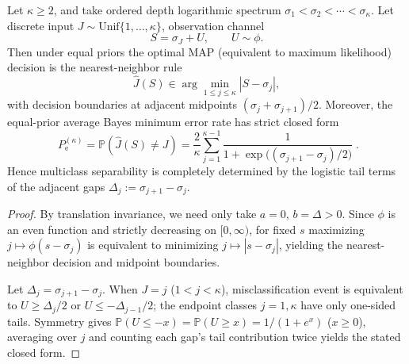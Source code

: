 

\begin{proposition}\label{prop:xi-logistic-multiclass-map-error}
Let \(\kappa\ge 2\), and take ordered depth logarithmic spectrum
\(
\sigma_1<\sigma_2<\cdots<\sigma_\kappa
\).
Let discrete input \(J\sim\mathrm{Unif}\{1,\dots,\kappa\}\), observation channel
\[
S=\sigma_J+U,
\qquad
U\sim\phi.
\]
Then under equal priors the optimal MAP (equivalent to maximum likelihood) decision is the nearest-neighbor rule
\[
\widehat J(S)\in\arg\min_{1\le j\le\kappa}|S-\sigma_j|,
\]
with decision boundaries at adjacent midpoints \((\sigma_j+\sigma_{j+1})/2\).
Moreover, the equal-prior average Bayes minimum error rate has strict closed form
\[
\boxed{\;
P_{\mathrm e}^{(\kappa)}
=\mathbb P(\widehat J(S)\neq J)
=\frac{2}{\kappa}\sum_{j=1}^{\kappa-1}\frac{1}{1+\exp\!\bigl((\sigma_{j+1}-\sigma_j)/2\bigr)}\; }.
\]
Hence multiclass separability is completely determined by the logistic tail terms of the adjacent gaps \(\Delta_j:=\sigma_{j+1}-\sigma_j\).
\end{proposition}
\begin{proof}
By translation invariance, we need only take \(a=0\), \(b=\Delta>0\).
Since \(\phi\) is an even function and strictly decreasing on \([0,\infty)\), for fixed \(s\) maximizing \(j\mapsto \phi(s-\sigma_j)\) is equivalent to minimizing \(j\mapsto |s-\sigma_j|\), yielding the nearest-neighbor decision and midpoint boundaries.
\par
Let \(\Delta_j=\sigma_{j+1}-\sigma_j\).
When \(J=j\) (\(1<j<\kappa\)), misclassification event is equivalent to
\(
U\ge \Delta_j/2
\)
or
\(
U\le -\Delta_{j-1}/2
\);
the endpoint classes \(j=1,\kappa\) have only one-sided tails.
Symmetry gives
\(
\mathbb P(U\le -x)=\mathbb P(U\ge x)=1/(1+e^{x})
\) (\(x\ge 0\)),
averaging over \(j\) and counting each gap's tail contribution twice yields the stated closed form.
\end{proof}


